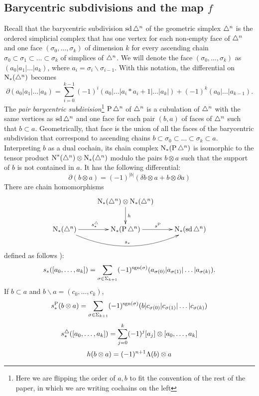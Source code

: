\subsection{Barycentric subdivisions and the map $f$} Recall that the barycentric subdivision $\operatorname{sd} \triangle^n$ of the geometric simplex $\triangle^n$ is the ordered simplicial complex that has one vertex for each non-empty face of $\triangle^n$ and one face $(\sigma_0,\ldots,\sigma_k)$ of dimension $k$ for every ascending chain $\sigma_0\subset \sigma_1\subset\ldots \subset \sigma_k$ of simplices of $\triangle^n$. We will denote the face $(\sigma_0,\ldots,\sigma_k)$ as $(a_0|a_1|\ldots|a_k)$, where $a_i = \sigma_i\smallsetminus \sigma_{i-1}$. With this notation, the differential on $\operatorname{N}_*(\triangle^n)$ becomes
\[
\partial(a_0|a_1|\ldots|a_k) = \sum_{i=0}^{k-1} (-1)^i(a_0|\ldots|a_i*a_i+1|\ldots |a_k|) + (-1)^k (a_0|\ldots|a_{k-1}).
\]
The \emph{pair barycentric subdivision}\footnote{Here we are flipping the order of $a,b$ to fit the convention of the rest of the paper, in which we are writing cochains on the left} $\operatorname{P} \triangle^n$ of $\triangle^n$ is a cubulation of $\triangle^n$ with the same vertices as $\operatorname{sd} \triangle^n$ and one face for each pair $(b,a)$ of faces of $\triangle^n$ such that $b\subset a$. Geometrically, that face is the union of all the faces of the barycentric subdivision that correspond to ascending chains $b\subset \sigma_0\subset \ldots\subset \sigma_k\subset a$. Interpreting $b$ as a dual cochain, its chain complex $\operatorname{N}_*(\operatorname{P} \triangle^n)$ is isomorphic to the tensor product $\operatorname{N}^*(\triangle^n)\otimes \operatorname{N}_*(\triangle^n)$ modulo the pairs $b\otimes a$ such that the support of $b$ is not contained in $a$. It has the following differential:
\[\partial(b\otimes a) = (-1)^{|b|}(\delta b\otimes a + b\otimes \partial a)\]
There are chain homomorphisms
\[
\xymatrix{
	&\chains_*(\simplex^n)\otimes \chains_*(\simplex^n)\ar[d]^h& \\
	\chains_*(\simplex^n)\ar[r]^{s_*^{\simplex}}\ar@/_2.0pc/[rr]^{s_*} & \chains_*(\Psd \simplex^n)\ar[r]^{s^{\Psd}} & \chains_*(\sd\simplex^n)
}
\]
defined as follows \cite[\P 1.12]{Rounds2010}):
\[
s_*([a_0,\ldots,a_k]) = \sum_{\sigma\in \Sigma_{k+1}} (-1)^{\operatorname*{sgn}(\sigma)}(a_{\sigma(0)}|a_{\sigma(1)}|\ldots|a_{\sigma(k)}).
\]
If $b\subset a$ and $b\smallsetminus a = (c_0,\ldots,c_{k})$,
\[
s_*^{\operatorname{P}}(b\otimes a) = \sum_{\sigma\in \Sigma_{k+1}} (-1)^{\operatorname*{sgn}(\sigma)} (b|c_{\sigma(0)}|c_{\sigma(1)}|\ldots|c_{\sigma(k)})
\]
\[
s_*^{\triangle}([a_0,\ldots,a_k]) = \sum_{j=0}^k (-1)^j[a_j]\otimes [a_0,\ldots,a_k]
\]
\[
h( b\otimes a) = (-1)^{n+1}\Lambda(b)\otimes a
\]

